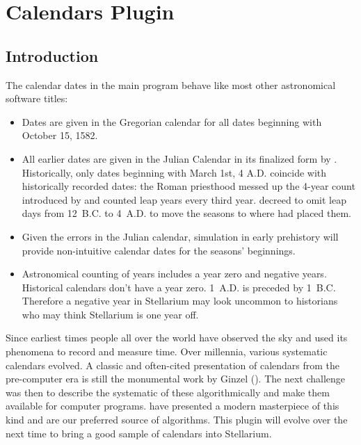 

\newpage
\section{Calendars Plugin}
\label{sec:plugin:Calendars}



\subsection{Introduction}
\label{sec:plugin:Calendars:Introduction}

The calendar dates in the main program behave like most other astronomical software titles:

\begin{itemize}
\item Dates are given in the Gregorian calendar for all dates
  beginning with October 15, 1582.
\item All earlier dates are given in the Julian Calendar in its
  finalized form by . Historically, only dates
  beginning with March 1st, 4 A.D. coincide with historically recorded
  dates: the Roman priesthood messed up the 4-year count introduced by
   and counted leap years every third
  year.  decreed to omit leap days from 12~B.C. to
  4~A.D. to move the seasons to where  had placed
  them.
\item Given the errors in the Julian calendar, simulation in early
  prehistory will provide non-intuitive calendar dates for the
  seasons' beginnings.
\item Astronomical counting of years includes a year zero and negative
  years. Historical calendars don't have a year zero. 1~A.D. is
  preceded by 1~B.C. Therefore a negative year in Stellarium may look
  uncommon to historians who may think Stellarium is one year off.
\end{itemize}

\noindent Since earliest times people all over the world have observed the sky
and used its phenomena to record and measure time. Over millennia,
various systematic calendars evolved. A classic and often-cited
presentation of calendars from the pre-computer era is still the
monumental work by Ginzel (\citeyear{Ginzel:ChronologieI, Ginzel:ChronologieII,
  Ginzel:ChronologieIII}).  The next challenge was then to describe the
systematic of these algorithmically and make them available for
computer programs.  \citet{Reingold-Dershowitz:2018} have presented a
modern masterpiece of this kind and are our preferred source of
algorithms. This plugin  will evolve over the next
time to bring a good sample of calendars into Stellarium.

